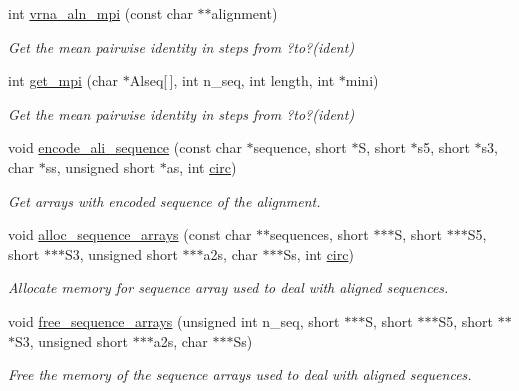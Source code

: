 \begin{DoxyCompactItemize}
\item 
int \hyperlink{group__consensus__fold_gade5a1f2d16e7fd9a57b37d8514f08e8e}{vrna\+\_\+aln\+\_\+mpi} (const char $\ast$$\ast$alignment)
\begin{DoxyCompactList}\small\item\em Get the mean pairwise identity in steps from ?to?(ident) \end{DoxyCompactList}\item 
int \hyperlink{group__consensus__fold_gaa2d600be90844094ec145ea14a314d2f}{get\+\_\+mpi} (char $\ast$Alseq\mbox{[}$\,$\mbox{]}, int n\+\_\+seq, int length, int $\ast$mini)
\begin{DoxyCompactList}\small\item\em Get the mean pairwise identity in steps from ?to?(ident) \end{DoxyCompactList}\item 
void \hyperlink{group__consensus__fold_gaa3e40277c837d6f7603afe319884c786}{encode\+\_\+ali\+\_\+sequence} (const char $\ast$sequence, short $\ast$S, short $\ast$s5, short $\ast$s3, char $\ast$ss, unsigned short $\ast$as, int \hyperlink{group__model__details_gaf9202a1a09f5828dc731e2d9a10fa111}{circ})
\begin{DoxyCompactList}\small\item\em Get arrays with encoded sequence of the alignment. \end{DoxyCompactList}\item 
void \hyperlink{group__consensus__fold_ga8a560930f7f2582cc3967723a86cfdfa}{alloc\+\_\+sequence\+\_\+arrays} (const char $\ast$$\ast$sequences, short $\ast$$\ast$$\ast$S, short $\ast$$\ast$$\ast$S5, short $\ast$$\ast$$\ast$S3, unsigned short $\ast$$\ast$$\ast$a2s, char $\ast$$\ast$$\ast$Ss, int \hyperlink{group__model__details_gaf9202a1a09f5828dc731e2d9a10fa111}{circ})
\begin{DoxyCompactList}\small\item\em Allocate memory for sequence array used to deal with aligned sequences. \end{DoxyCompactList}\item 
void \hyperlink{group__consensus__fold_ga298a420a8c879202e2617b3f724fde38}{free\+\_\+sequence\+\_\+arrays} (unsigned int n\+\_\+seq, short $\ast$$\ast$$\ast$S, short $\ast$$\ast$$\ast$S5, short $\ast$$\ast$$\ast$S3, unsigned short $\ast$$\ast$$\ast$a2s, char $\ast$$\ast$$\ast$Ss)
\begin{DoxyCompactList}\small\item\em Free the memory of the sequence arrays used to deal with aligned sequences. \end{DoxyCompactList}\end{DoxyCompactItemize}
